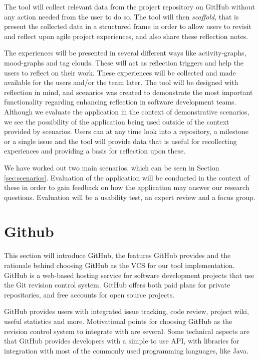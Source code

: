 The tool will collect relevant data from the project repository on GitHub without any action needed from the user to do so. The tool will then \emph{scaffold}, that is present the collected data in a structured frame in order to allow users to revisit and reflect upon agile project experiences, and also share these reflection notes.

The experiences will be presented in several different ways like activity-graphs, mood-graphs and tag clouds. These will act as reflection triggers and help the users to reflect on their work. These experiences will be collected and made available for the users and/or the team later. The tool will be designed with reflection in mind, and scenarios was created to demonstrate the most important functionality regarding enhancing reflection in software development teams. Although we evaluate the application in the context of demonstrative scenarios, we see the possibility of the application being used outside of the context provided by scenarios. Users can at any time look into a repository, a milestone or a single issue and the tool will provide data that is useful for recollecting experiences and providing a basis for reflection upon these. 

We have worked out two main scenarios, which can be seen in Section \ref{sec:scenarios}. Evaluation of the application will be conducted in the context of these in order to gain feedback on how the application may answer our research questions. Evaluation will be a usability test, an expert review and a focus group. 

\section{Github}
\label{githubchapter}
This section will introduce GitHub, the features GitHub provides and the rationale behind choosing GitHub as the VCS for our tool implementation. 
GitHub is a web-based hosting service for software development projects that use the Git revision control system\citep{git,github}. GitHub offers both paid plans for private repositories, and free accounts for open source projects.

GitHub provides users with integrated issue tracking, code review, project wiki, useful statistics and more. 
Motivational points for choosing GitHub as the revision control system to integrate with are several. Some technical aspects are that GitHub provides developers with a simple to use API\citep{githubapi}, with libraries for integration with most of the commonly used programming languages, like Java\citep{jgit}.

